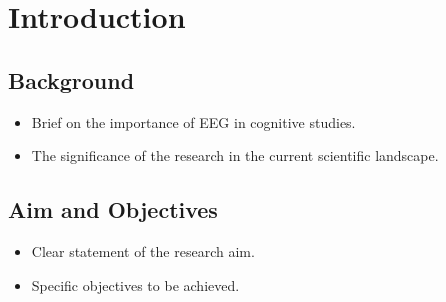 \chapter{\rm\bfseries Introduction}
\label{ch:chapter01}

\section{Background}

\begin{itemize}
\item{Brief on the importance of EEG in cognitive studies.}
\item {The significance of the research in the current scientific landscape.}
\end{itemize}

\section{Aim and Objectives}

\begin{itemize}
\item{Clear statement of the research aim.}
\item{Specific objectives to be achieved.}
\end{itemize}